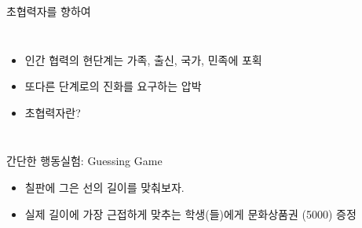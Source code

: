 \documentclass[final]{beamer}
\begin{document}
\begin{frame}[t]{초협력자를 향하여}
	\begin{columns}[c]
		\column{12em}
		\begin{itemize}
			\item 인간 협력의 현단계는 가족, 출신, 국가, 민족에 포획 
			\item 또다른 단계로의 진화를 요구하는 압박 
			\item 초협력자란?
		\end{itemize}
		\column{18em}
	\end{columns}
\end{frame}

\begin{frame}[t]{간단한 행동실험: Guessing Game}
	\begin{itemize}
		\item 칠판에 그은 선의 길이를 맞춰보자. 
		\item 실제 길이에 가장 근접하게 맞추는 학생(들)에게 문화상품권 (5000) 증정
	\end{itemize}
\end{frame}

\end{document}
